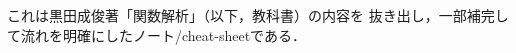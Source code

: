 \documentclass[a4j]{jsarticle}
\begin{document}
    これは黒田成俊著「関数解析」（以下，教科書）の内容を
    抜き出し，一部補完して流れを明確にしたノート/cheat-sheetである．

    
    
    
\end{document}
